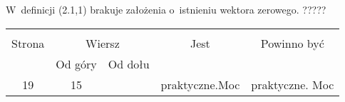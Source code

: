 \documentclass[a4paper,11pt]{article}
\begin{document}
\vspace{\spaceTwo}













 W~definicji (2.1,1) brakuje założenia o~istnieniu wektora zerowego. ?????

\vspace{\spaceFour}







\begin{center}

  \begin{tabular}{|c|c|c|c|c|}
    \hline
    & \multicolumn{2}{c|}{} & & \\
    Strona & \multicolumn{2}{c|}{Wiersz} & Jest
                              & Powinno być \\ \cline{2-3}
    & Od góry & Od dołu & & \\
    \hline
    19  & 15 & & praktyczne.Moc & praktyczne. Moc \\
    \hline
  \end{tabular}

\end{center}


\vspace{\spaceTwo}












{}






\end{document}
